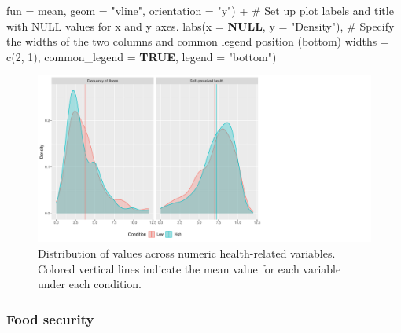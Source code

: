 \documentclass[
  bookmarksnumbered]{article}
\newenvironment{Shaded}{\begin{snugshade}}{\end{snugshade}}
\newcommand{\AttributeTok}[1]{\textcolor[rgb]{0.80,0.80,0.80}{#1}}
\newcommand{\CommentTok}[1]{\textcolor[rgb]{0.50,0.62,0.50}{#1}}
\newcommand{\ConstantTok}[1]{\textcolor[rgb]{0.86,0.64,0.64}{\textbf{#1}}}
\newcommand{\DecValTok}[1]{\textcolor[rgb]{0.86,0.86,0.80}{#1}}
\newcommand{\FunctionTok}[1]{\textcolor[rgb]{0.94,0.94,0.56}{#1}}
\newcommand{\NormalTok}[1]{\textcolor[rgb]{0.80,0.80,0.80}{#1}}
\newcommand{\SpecialCharTok}[1]{\textcolor[rgb]{0.86,0.64,0.64}{#1}}
\newcommand{\StringTok}[1]{\textcolor[rgb]{0.80,0.58,0.58}{#1}}
\begin{document}
\begin{Shaded}
\begin{Highlighting}[]
                \AttributeTok{fun =}\NormalTok{ mean, }\AttributeTok{geom =} \StringTok{"vline"}\NormalTok{, }\AttributeTok{orientation =} \StringTok{"y"}\NormalTok{) }\SpecialCharTok{+}
  \CommentTok{\# Set up plot labels and title with NULL values for x and y axes.}
  \FunctionTok{labs}\NormalTok{(}\AttributeTok{x =} \ConstantTok{NULL}\NormalTok{, }\AttributeTok{y =} \StringTok{"Density"}\NormalTok{),}
  \CommentTok{\# Specify the widths of the two columns and common legend position (bottom)}
  \AttributeTok{widths =} \FunctionTok{c}\NormalTok{(}\DecValTok{2}\NormalTok{, }\DecValTok{1}\NormalTok{),}
  \AttributeTok{common\_legend =} \ConstantTok{TRUE}\NormalTok{,}
  \AttributeTok{legend =} \StringTok{"bottom"}\NormalTok{)}
\end{Highlighting}
\end{Shaded}

\begin{figure}
\centering
\includegraphics{Supplementary_material_files/figure-latex/health-desc-plot-1.pdf}
\caption{\label{fig:health-desc-plot}Distribution of values across numeric health-related variables. Colored vertical lines indicate the mean value for each variable under each condition.}
\end{figure}

\subsubsection{Food security}\label{food-security}
\end{document}
